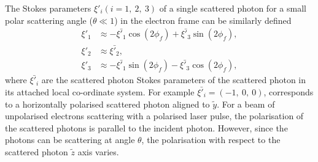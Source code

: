 \documentclass[../main.tex]{subfiles}
\begin{document}
The Stokes parameters $\xi'_{i} \left(i=1,~2,~3\right)$ of a single scattered photon  for a small polar scattering angle ($\theta \ll 1$) in the electron frame can be similarly defined
\begin{align}
\xi'_{1} &\approx -\bar{\xi'_{1}}\cos\left(2\phi_{f}\right)+\bar{\xi'_{3}}\sin\left(2\phi_{f}\right), \\
\xi'_{2} &\approx \bar{\xi'_{2}}, \\
\xi'_{3} &\approx -\bar{\xi'_{1}}\sin\left(2\phi_{f}\right)-\bar{\xi'_{3}}\cos\left(2\phi_{f}\right),
\end{align}
where $\bar{\xi'_{i}}$ are the scattered photon Stokes parameters of the scattered photon in its attached local co-ordinate system. For example $\bar{\xi'_{i}} = \left(-1,~0,~0\right)$, corresponds to a horizontally polarised scattered photon aligned to $\tilde{y}$. For a beam of unpolarised electrons scattering with a polarised laser pulse, the polarisation of the scattered photons is parallel to the incident photon. However, since the photons can be scattering at angle $\theta$, the polarisation with respect to the scattered photon $\tilde{z}$ axis varies. 
\end{document}
